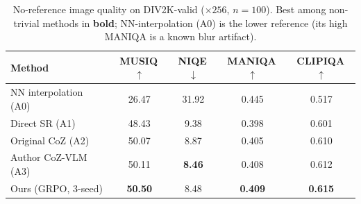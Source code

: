 \begin{table}[t]
\centering
\caption{No-reference image quality on DIV2K-valid ($\times256$, $n{=}100$). Best among non-trivial methods in \textbf{bold}; NN-interpolation (A0) is the lower reference (its high MANIQA is a known blur artifact).}
\label{tab:baseline}
\begin{tabular}{lcccc}
\toprule
Method & MUSIQ\,$\uparrow$ & NIQE\,$\downarrow$ & MANIQA\,$\uparrow$ & CLIPIQA\,$\uparrow$ \\
\midrule
NN interpolation (A0) & 26.47 & 31.92 & 0.445 & 0.517 \\
Direct SR (A1) & 48.43 & 9.38 & 0.398 & 0.601 \\
Original CoZ (A2) & 50.07 & 8.87 & 0.405 & 0.610 \\
Author CoZ-VLM (A3) & 50.11 & \textbf{8.46} & 0.408 & 0.612 \\
Ours (GRPO, 3-seed) & \textbf{50.50} & 8.48 & \textbf{0.409} & \textbf{0.615} \\
\bottomrule
\end{tabular}
\end{table}


